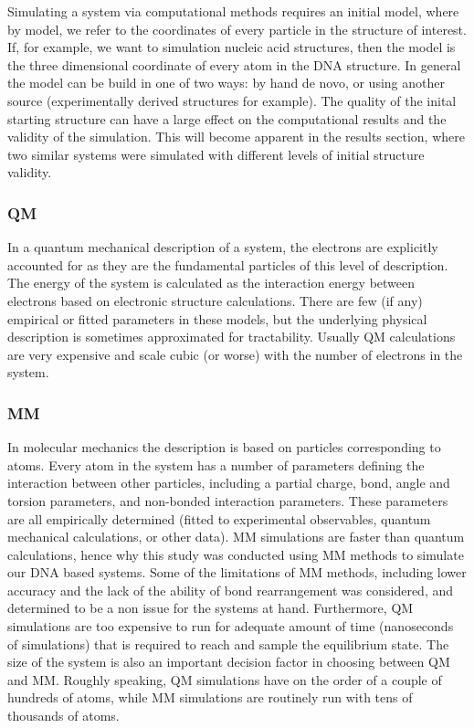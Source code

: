 \documentclass{report}
\begin{document}
Simulating a system via computational methods requires an initial model, where by model, we refer to the coordinates of every particle in the structure of interest. If, for example, we want to simulation nucleic acid structures, then the model is the three dimensional coordinate of every atom in the DNA structure. In general the model can be build in one of two ways: by hand de novo, or using another source (experimentally derived structures for example). The quality of the inital starting structure can have a large effect on the computational results and the validity of the simulation. This will become apparent in the results section, where two similar systems were simulated with different levels of initial structure validity.   

\subsubsection{QM}

In a quantum mechanical description of a system, the electrons are explicitly accounted for as they are the fundamental particles of this level of description. The energy of the system is calculated as the interaction energy between electrons based on electronic structure calculations. There are few (if any) empirical or fitted parameters in these models, but the underlying physical description is sometimes approximated for tractability. Usually QM calculations are very expensive and scale cubic (or worse) with the number of electrons in the system.

\subsubsection{MM}

In molecular mechanics the description is based on particles corresponding to atoms. Every atom in the system has a number of parameters defining the interaction between other particles, including a partial charge, bond, angle and torsion parameters, and non-bonded interaction parameters. These parameters are all empirically determined (fitted to experimental observables, quantum mechanical calculations, or other data). MM simulations are faster than quantum calculations, hence why this study was conducted using MM methods to simulate our DNA based systems. Some of the limitations of MM methods, including lower accuracy and the lack of the ability of bond rearrangement was considered, and determined to be a non issue for the systems at hand. Furthermore, QM simulations are too expensive to run for adequate amount of time (nanoseconds of simulations) that is required to reach and sample the equilibrium state. The size of the system is also an important decision factor in choosing between QM and MM. Roughly speaking, QM simulations have on the order of a couple of hundreds of atoms, while MM simulations are routinely run with tens of thousands of atoms.
\end{document}
